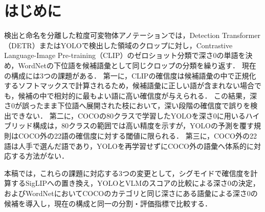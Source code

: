 \section{はじめに}
検出と命名を分離した粒度可変物体アノテーションでは，Detection Transformer（DETR）\cite{ref_DETR}またはYOLO\cite{ref_YOLO}で検出した領域のクロップに対し，Contrastive Language-Image Pre-training（CLIP）\cite{ref_CLIP}のゼロショット分類で深さ0の単語を決め，WordNet\cite{ref_WordNet}の下位語を候補語彙として同じクロップの分類を繰り返す．
現在の構成には3つの課題がある．
第一に，CLIPの確信度は候補語彙の中で正規化するソフトマックスで計算されるため，候補語彙に正しい語が含まれない場合でも，候補の中で相対的に最もよい語に高い確信度が与えられる．
この結果，深さ0が誤ったまま下位語へ展開された枝において，深い段階の確信度で誤りを検出できない．
第二に，COCO\cite{ref_COCO}の80クラスで学習したYOLOを深さ0に用いるハイブリッド構成は，80クラスの範囲では高い精度を示すが，YOLOの予測を覆す規則はCOCO外の22語の確信度に対する閾値に限られる．
第三に，COCO外の22語は人手で選んだ語であり，YOLOを再学習せずにCOCO外の語彙へ体系的に対応する方法がない．

本稿では，これらの課題に対応する3つの変更として，シグモイドで確信度を計算するSigLIP\cite{ref_SigLIP}への置き換え，YOLOとVLMのスコアの比較による深さ0の決定，およびWordNetにおいてCOCOのカテゴリと同じ深さにある語彙による深さ0の候補を導入し，現在の構成と同一の分割・評価指標で比較する．
